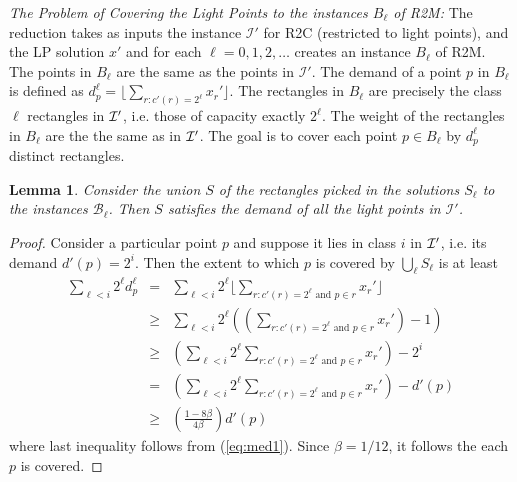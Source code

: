 \documentclass[11pt]{article}
\newtheorem{lemma}[thm]{Lemma}
\begin{document}
{\em The Problem of 
Covering the Light Points to the instances $B_\ell$ of R2M:} 
The reduction takes as inputs 
the instance $\mathcal I'$ for R2C (restricted to light points), and the LP solution $x'$ 
and for each $\ell =0,1,2,\ldots$ creates an instance $B_{\ell}$ of R2M.
The points in $B_\ell$ are the same as the points in $\mathcal I'$.
The demand of a point $p$ in $B_\ell$ is defined as 
$d^{\ell}_{p}=\lfloor \sum_{r : c'(r) = 2^\ell} x_r' \rfloor$.
The rectangles in $B_\ell$ are precisely the class $\ell$ rectangles in $\cal I'$, i.e. those of capacity  exactly $2^\ell$.
The weight of the rectangles in $B_\ell$ are the the same as in $\cal I'$.
The goal is to cover each point $p \in B_{\ell}$ by $d^{\ell}_p$ distinct rectangles. 



\begin{lemma}
Consider the union $S$ of the rectangles picked in the solutions $S_\ell$
to the instances ${\mathcal B}_\ell$.
Then $S$ satisfies the demand of  all the light points in $\mathcal I'$.
\end{lemma}
\begin{proof} 
Consider a particular point $p$ and suppose it lies in class $i$ in $\cal I'$, i.e. its demand $d'(p)=2^i$. Then the extent to which $p$ is
covered by $\bigcup_\ell S_\ell$ is at least
{\allowdisplaybreaks
\begin{eqnarray*}
\sum_{\ell < i} 2^\ell d^{\ell}_p  & =  &\sum_{\ell < i} 2^\ell \lfloor \sum_{r : c'(r) = 2^\ell \mbox{ and } p \in r}  x_r' \rfloor \\
&\ge&
\sum_{\ell < i} 2^\ell ( (\sum_{r : c'(r) = 2^\ell \mbox{ and } p \in r}  x_r')-1)  \\
&\ge& \left(\sum_{\ell < i} 2^\ell  \sum_{r : c'(r) = 2^\ell \mbox{ and } p \in r}  x_r'  \right) - 2^i \\
&= & \left( \sum_{\ell < i} 2^\ell  \sum_{r : c'(r) = 2^\ell \mbox{ and } p \in r}  x_r' \right)  - d'(p) \\
&\ge & \left(\frac{1 - 8 \beta}{4\beta} \right)  d'(p) 
\end{eqnarray*}
}
where last inequality follows from (\ref{eq:med1}).
Since $\beta=1/12$, it follows the each $p$ is covered.
\end{proof} 
\end{document}
